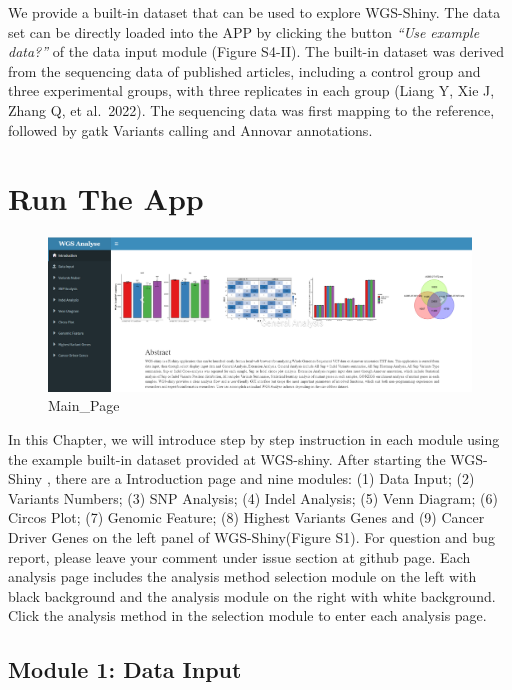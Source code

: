 \documentclass[
]{book}
\theoremstyle{definition}
\theoremstyle{definition}
\theoremstyle{definition}
\theoremstyle{definition}
\theoremstyle{remark}
\begin{document}
We provide a built-in dataset that can be used to explore WGS-Shiny. The data set can be directly loaded into the APP by clicking the button \emph{``Use example data?''} of the data input module (Figure S4-II). The built-in dataset was derived from the sequencing data of published articles, including a control group and three experimental groups, with three replicates in each group (Liang Y, Xie J, Zhang Q, et al.~2022). The sequencing data was first mapping to the reference, followed by gatk Variants calling and Annovar annotations.

\hypertarget{run-the-app}{%
\chapter{Run The App}\label{run-the-app}}

\begin{figure}
\includegraphics[width=1\linewidth]{figure/Main-page} \caption{Main_Page}\label{fig:unnamed-chunk-6}
\end{figure}

In this Chapter, we will introduce step by step instruction in each module using the example built-in dataset provided at WGS-shiny. After starting the WGS-Shiny , there are a Introduction page and nine modules: (1) Data Input; (2) Variants Numbers; (3) SNP Analysis; (4) Indel Analysis; (5) Venn Diagram; (6) Circos Plot; (7) Genomic Feature; (8) Highest Variants Genes and (9) Cancer Driver Genes on the left panel of WGS-Shiny(Figure S1). For question and bug report, please leave your comment under issue section at github page. Each analysis page includes the analysis method selection module on the left with black background and the analysis module on the right with white background. Click the analysis method in the selection module to enter each analysis page.

\hypertarget{module-1-data-input}{%
\section{Module 1: Data Input}\label{module-1-data-input}}
\end{document}
